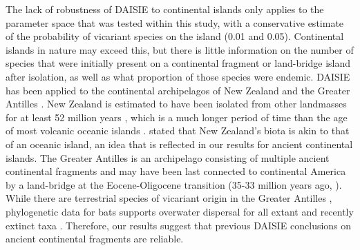 \documentclass{article}
\begin{document}
The lack of robustness of DAISIE to continental islands only applies to the parameter space that was tested within this study, with a conservative estimate of the probability of vicariant species on the island (0.01 and 0.05). Continental islands in nature may exceed this, but there is little information on the number of species that were initially present on a continental fragment or land-bridge island after isolation, as well as what proportion of those species were endemic. DAISIE has been applied to the continental archipelagos of New Zealand \citep{valente_deep_2019} and the Greater Antilles  \citep{valente_recent_2017}. New Zealand is estimated to have been isolated from other landmasses for at least 52 million years \citep{schellart_late_2006}, which is a much longer period of time than the age of most volcanic oceanic islands \citep{valente_simple_2020}. \cite{wallace_island_1880} stated that New Zealand’s biota is akin to that of an oceanic island, an idea that is reflected in our results for ancient continental islands. The Greater Antilles is an archipelago consisting of multiple ancient continental fragments and may have been last connected to continental America by a land-bridge at the Eocene-Oligocene transition (35-33 million years ago, \cite{iturralde_paleogeography_1999}). While there are terrestrial species of vicariant origin in the Greater Antilles \citep{brace_unexpected_2015}, phylogenetic data for bats supports overwater dispersal for all extant and recently extinct taxa \citep{valente_equilibrium_2017}. Therefore, our results suggest that previous DAISIE conclusions on ancient continental fragments are reliable. \\
\end{document}
